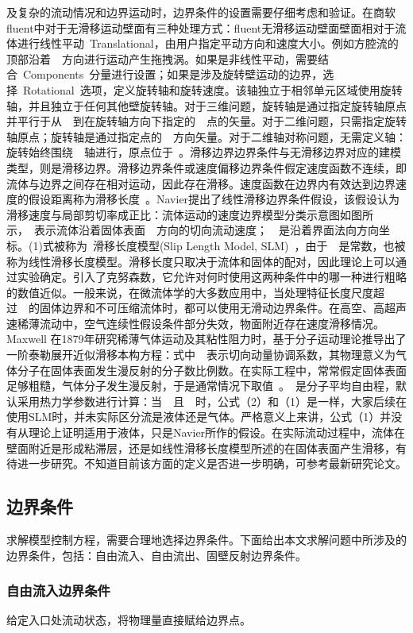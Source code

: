 \documentclass{article}
\numberwithin{equation}{section}    %
\begin{document}
及复杂的流动情况和边界运动时，边界条件的设置需要仔细考虑和验证。在商软fluent中对于无滑移运动壁面有三种处理方式：fluent无滑移运动壁面壁面相对于流体进行线性平动 Translational，由用户指定平动方向和速度大小。例如方腔流的顶部沿着  方向进行运动产生拖拽涡。如果是非线性平动，需要结合 Components 分量进行设置；如果是涉及旋转壁运动的边界，选择 Rotational 选项，定义旋转轴和旋转速度。该轴独立于相邻单元区域使用旋转轴，并且独立于任何其他壁旋转轴。对于三维问题，旋转轴是通过指定旋转轴原点并平行于从  到在旋转轴方向下指定的  点的矢量。对于二维问题，只需指定旋转轴原点；旋转轴是通过指定点的  方向矢量。对于二维轴对称问题，无需定义轴：旋转始终围绕  轴进行，原点位于 。滑移边界边界条件与无滑移边界对应的建模类型，则是滑移边界。滑移边界条件或速度偏移边界条件假定速度函数不连续，即流体与边界之间存在相对运动，因此存在滑移。速度函数在边界内有效达到边界速度的假设距离称为滑移长度 。Navier提出了线性滑移边界条件假设，该假设认为滑移速度与局部剪切率成正比：流体运动的速度边界模型分类示意图如图所示， 表示流体沿着固体表面  方向的切向流动速度；  是沿着界面法向方向坐标。(1)式被称为 滑移长度模型(Slip Length Model, SLM) ，由于  是常数，也被称为线性滑移长度模型。滑移长度只取决于流体和固体的配对，因此理论上可以通过实验确定。引入了克努森数，它允许对何时使用这两种条件中的哪一种进行粗略的数值近似。一般来说，在微流体学的大多数应用中，当处理特征长度尺度超过  的固体边界和不可压缩流体时，都可以使用无滑动边界条件。在高空、高超声速稀薄流动中，空气连续性假设条件部分失效，物面附近存在速度滑移情况。Maxwell 在1879年研究稀薄气体运动及其粘性阻力时，基于分子运动理论推导出了一阶泰勒展开近似滑移本构方程：式中  表示切向动量协调系数，其物理意义为气体分子在固体表面发生漫反射的分子数比例数。在实际工程中，常常假定固体表面足够粗糙，气体分子发生漫反射，于是通常情况下取值 。 是分子平均自由程，默认采用热力学参数进行计算：当  且  时，公式（2）和（1）是一样，大家后续在使用SLM时，并未实际区分流是液体还是气体。严格意义上来讲，公式（1）并没有从理论上证明适用于液体，只是Navier所作的假设。在实际流动过程中，流体在壁面附近是形成粘滞层，还是如线性滑移长度模型所述的在固体表面产生滑移，有待进一步研究。不知道目前该方面的定义是否进一步明确，可参考最新研究论文。

\subsection{边界条件}

求解模型控制方程，需要合理地选择边界条件。下面给出本文求解问题中所涉及的边界条件，包括：自由流入、自由流出、固壁反射边界条件。

\subsubsection{自由流入边界条件}
给定入口处流动状态，将物理量直接赋给边界点。
\end{document}
